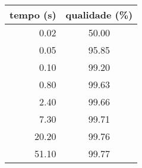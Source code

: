 \begin{tabular}{|r|c|}
  \hline
  \textbf{tempo (s)} & \textbf{qualidade (\%)} \\ \hline
     0.02 & 50.00 \\ \hline
     0.05 & 95.85 \\ \hline
     0.10 & 99.20 \\ \hline
     0.80 & 99.63 \\ \hline
     2.40 & 99.66 \\ \hline
     7.30 & 99.71 \\ \hline
    20.20 & 99.76 \\ \hline
    51.10 & 99.77 \\ \hline
\end{tabular}